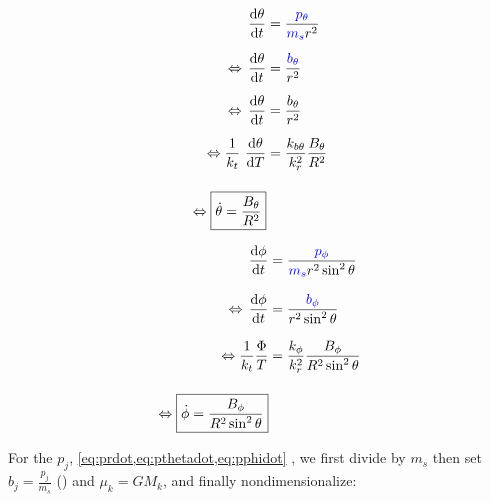 \begin{align}
    \operatorname{}\frac{\mathrm{d} \theta}{\mathrm{d} t} &= \frac{\textcolor{blue}{p_\theta}}{\textcolor{blue}{m_s} r^2} \\[0.2cm]
    \Leftrightarrow \operatorname{}\frac{\mathrm{d} \theta}{\mathrm{d} t} &= \frac{\textcolor{blue}{b_\theta}}{r^2} \\[0.2cm]
    \Leftrightarrow \operatorname{}\frac{\mathrm{d} \theta}{\mathrm{d} t} &= \frac{b_\theta}{r^2} \\[0.2cm]
    \Leftrightarrow \frac{1}{k_t} \operatorname{}\frac{\mathrm{d} \theta}{\mathrm{d} T} &= \frac{k_{b\theta}}{k_r^2} \frac{B_\theta}{R^2} \\[0.4cm]
    \Leftrightarrow \boxed{\dot{\theta} = \frac{B_\theta}{R^2}} 
\end{align}

\begin{align}
    \operatorname{}\frac{\mathrm{d} \phi}{\mathrm{d} t} &= \frac{\textcolor{blue}{p_\phi}}{{\textcolor{blue}{m_s}} r^2 \sin^2{\theta}} \\[0.3cm]
    \Leftrightarrow \operatorname{}\frac{\mathrm{d} \phi}{\mathrm{d} t} &= \frac{\textcolor{blue}{b_\phi}}{r^2 \sin^2{\theta}}  \\[0.3cm]
    \Leftrightarrow \frac{1}{k_t} \frac{\Phi}{T} &= \frac{k_\phi}{k_r^2} \frac{B_\phi}{R^2 \sin^2{\theta}} \\[0.4cm]
    \Leftrightarrow \boxed{\dot{\phi} = \frac{B_\phi}{R^2 \sin^2{\theta}}}
\end{align}

For the \(p_j\), \cref{eq:prdot,eq:pthetadot,eq:pphidot} , we first divide by \(m_s\) then set \(b_j = \frac{p_j}{m_s}\) () and \(\mu_k = G M_k\), and finally nondimensionalize:

